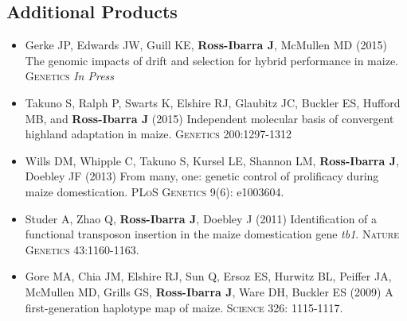 \documentclass[10pt]{article}
\begin{document}
\subsection*{Additional Products}

\begin{itemize} \setlength{\itemsep}{0pt} \setlength{\parskip}{2pt} \setlength{\parsep}{0pt}

\item Gerke JP, Edwards JW, Guill KE, {\bf Ross-Ibarra J}, McMullen MD (2015) The genomic impacts of drift and selection for hybrid performance in maize. \textsc{Genetics} \emph{In Press}

\item Takuno S, Ralph P, Swarts K, Elshire RJ, Glaubitz JC, Buckler ES, Hufford MB, and {\bf Ross-Ibarra J} (2015) Independent molecular basis of convergent highland adaptation in maize. \textsc{Genetics} 200:1297-1312

\item Wills DM, Whipple C, Takuno S, Kursel LE, Shannon LM, {\bf Ross-Ibarra J}, Doebley JF (2013) From many, one: genetic control of prolificacy during maize domestication. \textsc{PLoS Genetics} 9(6): e1003604. 

\item Studer A, Zhao Q, {\bf Ross-Ibarra J}, Doebley J (2011) Identification of a functional transposon insertion in the maize domestication gene \emph{tb1}.  \textsc{Nature Genetics} 43:1160-1163.






\item Gore MA, Chia JM, Elshire RJ, Sun Q, Ersoz ES, Hurwitz BL, Peiffer JA, McMullen MD, Grills GS, {\bf Ross-Ibarra J}, Ware DH, Buckler ES (2009) A first-generation haplotype map of maize.  \textsc{Science 326}: 1115-1117.

\end{itemize}
\end{document}
